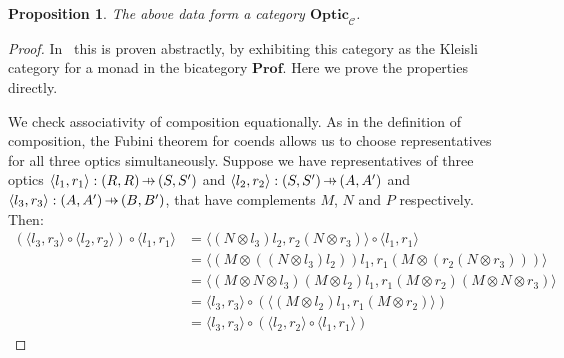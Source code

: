\documentclass[11pt,a4paper]{article}
\theoremstyle{plain}
\newtheorem{proposition}[theorem]{Proposition}
\theoremstyle{definition}
\newcommand{\C}{\mathscr{C}}
\newcommand{\Prof}{\mathbf{Prof}}
\newcommand{\Optic}{\mathbf{Optic}}
\newcommand{\hto}{\ensuremath{\,\mathaccent\shortmid\rightarrow\,}}
\begin{document}
\begin{proposition}
  The above data form a category $\Optic_\C$.
\end{proposition}
\begin{proof}
  In~\cite[Section 6]{Doubles} this is proven abstractly, by exhibiting this category as the Kleisli category for a monad in the bicategory $\Prof$. Here we prove the properties directly.

  We check associativity of composition equationally. As in the definition of composition, the Fubini theorem for coends allows us to choose representatives for all three optics simultaneously. Suppose we have representatives of three optics $\langle l_1, r_1\rangle : (R, R) \hto (S, S')$ and $\langle l_2, r_2 \rangle : (S, S') \hto (A, A')$ and $\langle l_3, r_3 \rangle : (A, A') \hto (B, B')$, that have complements $M$, $N$ and $P$ respectively. Then:
  \begin{align*}
    (\langle l_3, r_3 \rangle \circ \langle l_2, r_2 \rangle) \circ \langle l_1, r_1 \rangle
    &= \langle (N \otimes l_3)l_2, r_2(N \otimes r_3) \rangle \circ \langle l_1, r_1 \rangle \\
    &= \langle (M \otimes ((N \otimes l_3)l_2))l_1, r_1(M \otimes (r_2(N \otimes r_3))) \rangle \\
    &= \langle (M \otimes N \otimes l_3)(M \otimes l_2)l_1, r_1(M \otimes r_2)(M \otimes N \otimes r_3) \rangle \\
    &= \langle l_3, r_3 \rangle \circ (\langle (M \otimes l_2)l_1, r_1(M \otimes r_2) \rangle) \\
    &= \langle l_3, r_3 \rangle \circ (\langle l_2, r_2 \rangle \circ \langle l_1, r_1 \rangle)
  \end{align*}


\end{proof}
\end{document}
